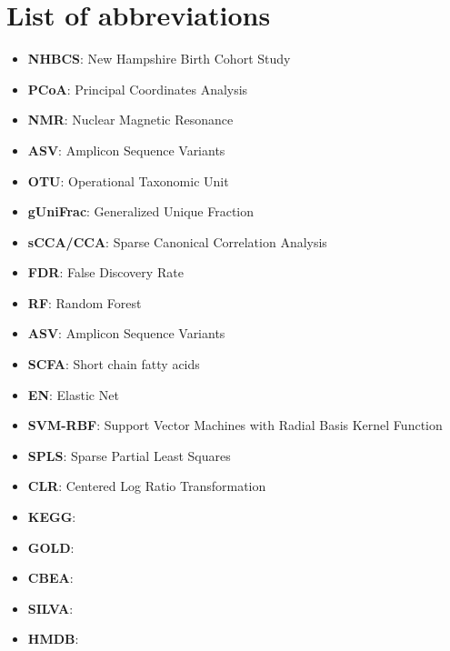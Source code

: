\chapter{List of abbreviations}


\begin{itemize}
    \item \textbf{NHBCS}: New Hampshire Birth Cohort Study
    \item \textbf{PCoA}: Principal Coordinates Analysis
    \item \textbf{NMR}: Nuclear Magnetic Resonance
    \item \textbf{ASV}: Amplicon Sequence Variants 
    \item \textbf{OTU}: Operational Taxonomic Unit
    \item \textbf{gUniFrac}: Generalized Unique Fraction
    \item \textbf{sCCA/CCA}: Sparse Canonical Correlation Analysis
    \item \textbf{FDR}: False Discovery Rate
    \item \textbf{RF}: Random Forest 
    \item \textbf{ASV}: Amplicon Sequence Variants
    \item \textbf{SCFA}: Short chain fatty acids
    \item \textbf{EN}: Elastic Net
    \item \textbf{SVM-RBF}: Support Vector Machines with Radial Basis Kernel Function 
    \item \textbf{SPLS}: Sparse Partial Least Squares
    \item \textbf{CLR}: Centered Log Ratio Transformation 
    \item \textbf{KEGG}: 
    \item \textbf{GOLD}:
    \item \textbf{CBEA}: 
    \item \textbf{SILVA}: 
    \item \textbf{HMDB}:
    
\end{itemize}
